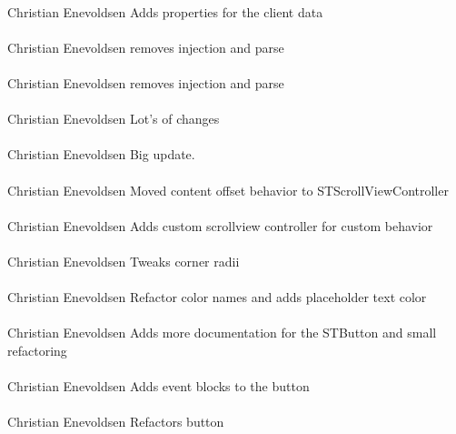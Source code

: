\documentclass[12pt]{article}
\begin{document}
\paragraph{}Christian Enevoldsen	Adds properties for the client data
\paragraph{}Christian Enevoldsen	removes injection and parse
\paragraph{}Christian Enevoldsen	removes injection and parse
\paragraph{}Christian Enevoldsen	Lot's of changes
\paragraph{}Christian Enevoldsen	Big update.
\paragraph{}Christian Enevoldsen	Moved content offset behavior to STScrollViewController
\paragraph{}Christian Enevoldsen	Adds custom scrollview controller for custom behavior
\paragraph{}Christian Enevoldsen	Tweaks corner radii
\paragraph{}Christian Enevoldsen	Refactor color names and adds placeholder text color
\paragraph{}Christian Enevoldsen	Adds more documentation for the STButton and small refactoring
\paragraph{}Christian Enevoldsen	Adds event blocks to the button
\paragraph{}Christian Enevoldsen	Refactors button
\end{document}
